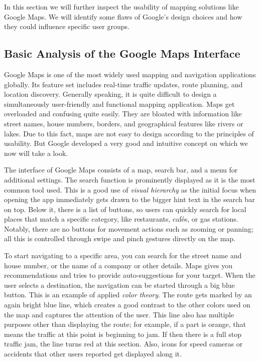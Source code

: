 \Author{\daAuthorTwo}

In this section we will further inspect the usability of mapping solutions like Google Maps. We will identify some flaws of Google's design choices and how they could influence specific user groups.

\subsection{Basic Analysis of the Google Maps Interface}

Google Maps is one of the most widely used mapping and navigation applications globally. Its feature set includes real-time traffic updates, route planning, and location discovery. Generally speaking, it is quite difficult to design a simultaneously user-friendly and functional mapping application. Maps get overloaded and confusing quite easily. They are bloated with information like street names, house numbers, borders, and geographical features like rivers or lakes. Due to this fact, maps are not easy to design according to the principles of usability. But Google developed a very good and intuitive concept on which we now will take a look.

\blankLine

The interface of Google Maps consists of a map, search bar, and a menu for additional settings. The search function is prominently displayed as it is the most common tool used. This is a good use of \textit{visual hierarchy} as the initial focus when opening the app immediately gets drawn to the bigger hint text in the search bar on top. Below it, there is a list of buttons, so users can quickly search for local places that match a specific category, like restaurants, cafés, or gas stations. Notably, there are no buttons for movement actions such as zooming or panning; all this is controlled through swipe and pinch gestures directly on the map. \autocite{battersby2008user}

\blankLine

To start navigating to a specific area, you can search for the street name and house number, or the name of a company or other details. Maps gives you recommendations and tries to provide auto-suggestions for your target. When the user selects a destination, the navigation can be started through a big blue button. This is an example of applied \textit{color theory}. The route gets marked by an again bright blue line, which creates a good contrast to the other colors used on the map and captures the attention of the user. This line also has multiple purposes other than displaying the route; for example, if a part is orange, that means the traffic at this point is beginning to jam. If then there is a full stop traffic jam, the line turns red at this section. Also, icons for speed cameras or accidents that other users reported get displayed along it.


